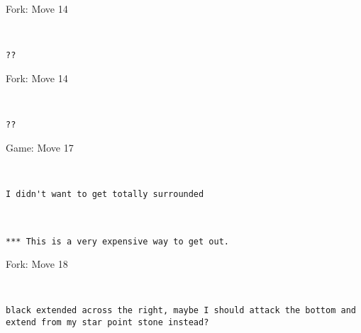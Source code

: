 \documentclass[twocolumn]{article}
\begin{document}
\begin{subsection}{Fork: Move 14}
\begin{center}
\cleargoban
{}
\showfullgoban
\\\begin{lstlisting}
??\end{lstlisting}
\end{center}
\end{subsection}
\begin{subsection}{Fork: Move 14}
\begin{center}
\cleargoban
{}
\showfullgoban
\\\begin{lstlisting}
??\end{lstlisting}
\end{center}
\end{subsection}
\newpage
\begin{section}{Game: Move 17}
\begin{center}
\cleargoban
{}
\showfullgoban
\\\begin{lstlisting}
I didn't want to get totally surrounded



*** This is a very expensive way to get out.\end{lstlisting}
\end{center}
\end{section}
\begin{subsection}{Fork: Move 18}
\begin{center}
\cleargoban
{}
\showfullgoban
\\\begin{lstlisting}
black extended across the right, maybe I should attack the bottom and extend from my star point stone instead?\end{lstlisting}
\end{center}
\end{subsection}
\newpage
\end{document}
